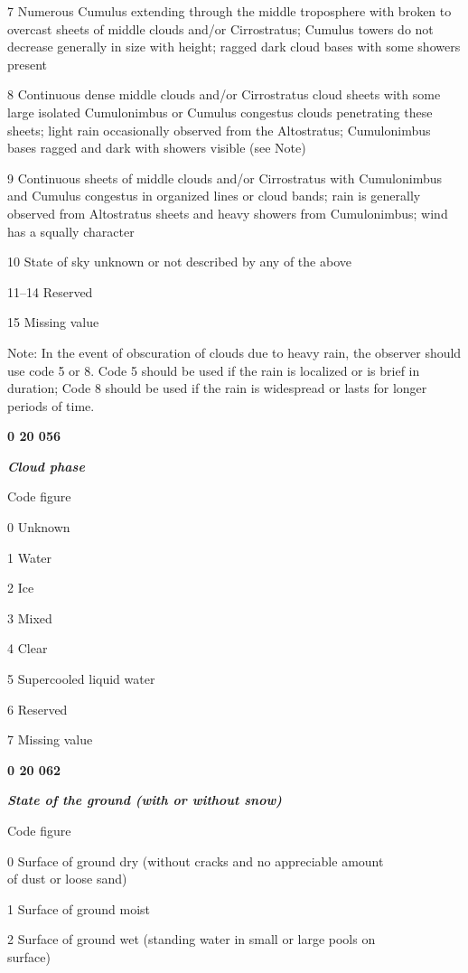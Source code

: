 7 Numerous Cumulus extending through the middle troposphere with broken to overcast sheets of middle clouds and/or Cirrostratus; Cumulus towers do not decrease generally in size with height; ragged dark cloud bases with some showers present

8 Continuous dense middle clouds and/or Cirrostratus cloud sheets with some large isolated Cumulonimbus or Cumulus congestus clouds penetrating these sheets; light rain occasionally observed from the Altostratus; Cumulonimbus bases ragged and dark with showers visible (see Note)

9 Continuous sheets of middle clouds and/or Cirrostratus with Cumulonimbus and Cumulus congestus in organized lines or cloud bands; rain is generally observed from Altostratus sheets and heavy showers from Cumulonimbus; wind has a squally character

10 State of sky unknown or not described by any of the above

11--14 Reserved

15 Missing value

Note: In the event of obscuration of clouds due to heavy rain, the observer should use code 5 or 8. Code 5 should be used if the rain is localized or is brief in duration; Code 8 should be used if the rain is widespread or lasts for longer periods of time.

\textbf{0 20 056}

\emph{\textbf{Cloud phase}}

Code figure

0 Unknown

1 Water

2 Ice

3 Mixed

4 Clear

5 Supercooled liquid water

6 Reserved

7 Missing value

\textbf{0 20 062}

\emph{\textbf{State of the ground (with or without snow)}}

Code figure

0 Surface of ground dry (without cracks and no appreciable amount\\
of dust or loose sand)

1 Surface of ground moist

2 Surface of ground wet (standing water in small or large pools on\\
surface)


